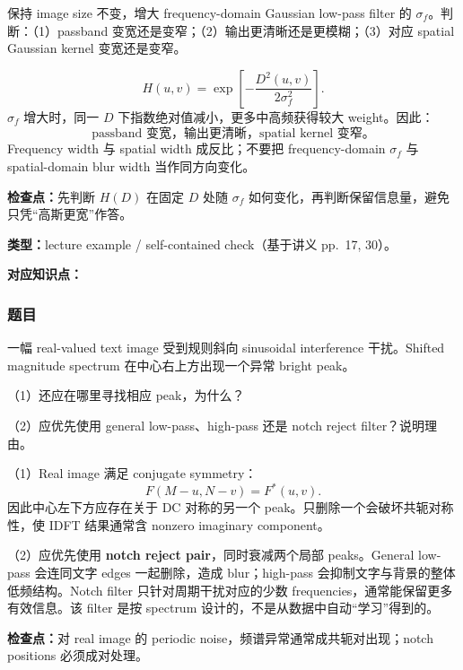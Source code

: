 保持 image size 不变，增大 frequency-domain Gaussian low-pass filter 的 $\sigma_f$。判断：（1）passband 变宽还是变窄；（2）输出更清晰还是更模糊；（3）对应 spatial Gaussian kernel 变宽还是变窄。

\begin{checkedsolution}
\[
  H(u,v)=\exp\!\left[-\frac{D^2(u,v)}{2\sigma_f^2}\right].
\]
$\sigma_f$ 增大时，同一 $D$ 下指数绝对值减小，更多中高频获得较大 weight。因此：
\[
  \boxed{\text{passband 变宽，输出更清晰，spatial kernel 变窄。}}
\]
Frequency width 与 spatial width 成反比；不要把 frequency-domain $\sigma_f$ 与 spatial-domain blur width 当作同方向变化。
\end{checkedsolution}

\textbf{检查点：}先判断 $H(D)$ 在固定 $D$ 处随 $\sigma_f$ 如何变化，再判断保留信息量，避免只凭``高斯更宽''作答。


\textbf{类型：}lecture example / self-contained check（基于讲义 pp.~17, 30）。

\textbf{对应知识点：}

\subsubsection*{题目}

一幅 real-valued text image 受到规则斜向 sinusoidal interference 干扰。Shifted magnitude spectrum 在中心右上方出现一个异常 bright peak。

（1）还应在哪里寻找相应 peak，为什么？

（2）应优先使用 general low-pass、high-pass 还是 notch reject filter？说明理由。

\begin{checkedsolution}
（1）Real image 满足 conjugate symmetry：
\[
  F(M-u,N-v)=F^*(u,v).
\]
因此中心左下方应存在关于 DC 对称的另一个 peak。只删除一个会破坏共轭对称性，使 IDFT 结果通常含 nonzero imaginary component。

（2）应优先使用 \textbf{notch reject pair}，同时衰减两个局部 peaks。General low-pass 会连同文字 edges 一起删除，造成 blur；high-pass 会抑制文字与背景的整体低频结构。Notch filter 只针对周期干扰对应的少数 frequencies，通常能保留更多有效信息。该 filter 是按 spectrum 设计的，不是从数据中自动``学习''得到的。
\end{checkedsolution}

\textbf{检查点：}对 real image 的 periodic noise，频谱异常通常成共轭对出现；notch positions 必须成对处理。

